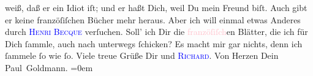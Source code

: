                weiß, daß er ein Idiot iſt;
               und er {\pb}haßt Dich, weil Du mein Freund biſt. Auch
               gibt er keine franzöſiſchen Bücher mehr heraus. Aber ich will einmal etwas Anderes
               durch \textsc{\textcolor{blue}{Henri Becque}{}\ledrightnote{\textcolor{blue}{Henry Becque}}} verſuchen.\pend
           \pstart
           Soll’ ich Dir die \textcolor{pink}{franzöſiſch}{}en
               Blätter, die ich für Dich ſammle, auch nach unterwegs ſchicken? Es macht mir gar
               nichts, denn ich ſammele ſo wie ſo.\pend
           \pstart
           Viele treue Grüße Dir und \textsc{\textcolor{blue}{Richard}{}\ledrightnote{\textcolor{blue}{Richard Beer-Hofmann}}}. Von Herzen\pend
           \pstart
           Dein {\\[\baselineskip]}\spacefill\mbox{Paul Goldmann.}\pend
           \leftskip=0em{}\endnumbering{}\begin{anhang}\end{anhang}
      